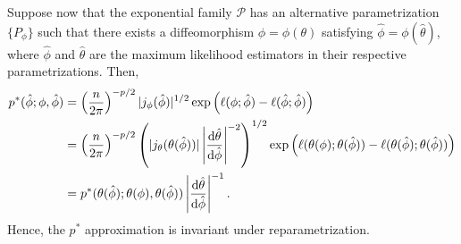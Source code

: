 Suppose now that the exponential family $\mathcal{P}$ has an alternative parametrization $\{ P_\phi \}$ such that there exists a diffeomorphism $\phi = \phi(\theta)$ satisfying $\hat\phi = \phi(\hat\theta)$, where $\hat\phi$ and $\hat\theta$ are the maximum likelihood estimators in their respective parametrizations. Then, 
\begin{align*}
    p^*(\hat\phi; \phi, \hat \phi) 
&= \left(\frac{n}{2\pi}\right)^{-p/2}|j_\phi(\hat\phi)|^{1/2} \exp\left(\ell(\phi; \hat \phi) - \ell(\hat\phi; \hat \phi)\right)\\
&= \left(\frac{n}{2\pi}\right)^{-p/2}\left(|j_\theta(\theta(\hat\phi))|\left|\frac{\text{d} \hat\theta}{\text{d} \hat\phi}\right|^{-2}\right)^{1/2} \exp\left(\ell(\theta(\phi); \theta(\hat \phi)) - \ell(\theta(\hat\phi); \theta(\hat \phi))\right)\\
&= p^*(\theta(\hat\phi); \theta(\phi), \theta(\hat \phi))\left|\frac{\text{d} \hat\theta}{\text{d} \hat\phi}\right|^{-1}.
\end{align*}
Hence, the $p^*$ approximation is invariant under reparametrization. 

